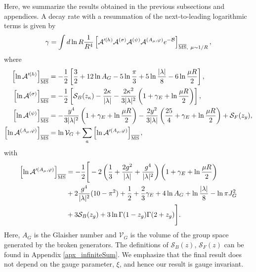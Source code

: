 \documentclass[12pt]{article}
\begin{document}
Here, we summarize the results obtained in the previous subsections
and appendices.  A decay rate with a resummation of the
next-to-leading logarithmic terms is given by
\begin{align}
  \gamma = \int d\ln R \frac{1}{R^{4}}
  \left[
    \mathcal A'^{(h)}\mathcal A^{(\sigma)}\mathcal A^{(\psi)}
    \mathcal A^{(A_\mu,\varphi)}e^{-\mathcal B}
  \right]_{\overline{\rm MS},~\mu\sim 1/R},
\end{align}
where
\begin{align}
  \left[
    \ln\mathcal A'^{(h)}
  \right]_{\overline{\rm MS}}
  & = -\frac{1}{2}
  \left[
    \frac{3}{2}+12\ln A_G-5\ln\frac{\pi}{3}
    +5\ln\frac{|\lambda|}{8}-6\ln\frac{\mu R}{2}
  \right],
  \label{A'^(h)}
  \\
  \left[
    \ln\mathcal A^{(\sigma)}
  \right]_{\overline{\rm MS}}
  & = -\frac{1}{2}
  \left[
    \mathcal S_B(z_\kappa)-\frac{2\kappa}{|\lambda|}-\frac{2\kappa^2}{3|\lambda|^2}
    \left(
      1+\gamma_E+\ln\frac{\mu R}{2}
    \right)
  \right],                       \\
  \left[
    \ln\mathcal A^{(\psi)}
  \right]_{\overline{\rm MS}}
  & = -\frac{y^4}{3|\lambda|^2}
  \left(
    1+\gamma_E+\ln\frac{\mu R}{2}
  \right)-\frac{2y^2}{3|\lambda|}
  \left(
    \frac{25}{4}+\gamma_E+\ln\frac{\mu R}{2}
  \right)+\mathcal S_F(z_y),   \\
  \left[
    \ln\mathcal A^{(A_\mu,\varphi)}
  \right]_{\overline{\rm MS}}
  & = \ln\mathcal V_G+\sum_a
  \left[
    \ln\mathcal A'^{(A_\mu,\varphi)}
  \right]_{\overline{\rm MS}},
\end{align}
with
\begin{align}
  \left[
    \ln\mathcal A'^{(A_\mu,\varphi)}
  \right]_{\overline{\rm MS}}
  & = -\frac{1}{2}
  \Bigg[
  -2
  \left(
    \frac{1}{3}+\frac{2g^2}{|\lambda|}+\frac{g^4}{|\lambda|^2}
  \right)
  \left(
    1+\gamma_E+\ln\frac{\mu R}{2}
  \right)
  \nonumber
  \\ & 
  +2\frac{g^4}{|\lambda|^2}(10-\pi^2)+\frac{1}{2}
  +\frac{2}{3}\gamma_E+4\ln A_G+\ln\frac{|\lambda|}{8}-\ln\pi J_G^2
  \nonumber
  \\ & 
  +3\mathcal S_B(z_g)+3\ln\Gamma(1-z_g)\Gamma(2+z_g)
  \Bigg] .
  \label{A'(A,NG)}
\end{align}
Here, $A_G$ is the Glaisher number and $\mathcal V_G$ is the volume of
the group space generated by the broken generators.  The definitions
of $\mathcal S_B(z)$, $\mathcal S_F(z)$ can be found in Appendix
\ref{apx_infiniteSum}.  We emphasize that the final result does not
depend on the gauge parameter, $\xi$, and hence our result is gauge
invariant.
\end{document}
